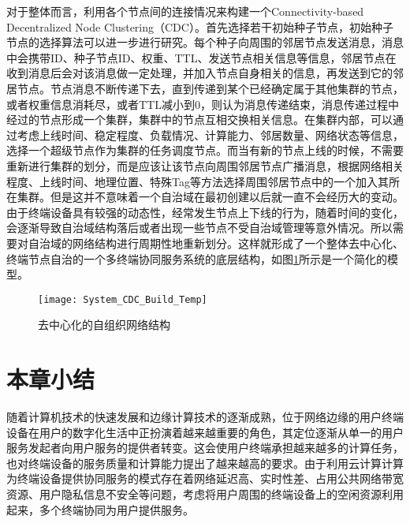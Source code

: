 对于整体而言，利用各个节点间的连接情况来构建一个Connectivity-based Decentralized Node Clustering（CDC）。首先选择若干初始种子节点，初始种子节点的选择算法可以进一步进行研究。每个种子向周围的邻居节点发送消息，消息中会携带ID、种子节点ID、权重、TTL、发送节点相关信息等信息，邻居节点在收到消息后会对该消息做一定处理，并加入节点自身相关的信息，再发送到它的邻居节点。节点消息不断传递下去，直到传递到某个已经确定属于其他集群的节点，或者权重信息消耗尽，或者TTL减小到0，则认为消息传递结束，消息传递过程中经过的节点形成一个集群，集群中的节点互相交换相关信息。在集群内部，可以通过考虑上线时间、稳定程度、负载情况、计算能力、邻居数量、网络状态等信息，选择一个超级节点作为集群的任务调度节点。而当有新的节点上线的时候，不需要重新进行集群的划分，而是应该让该节点向周围邻居节点广播消息，根据网络相关程度、上线时间、地理位置、特殊Tag等方法选择周围邻居节点中的一个加入其所在集群。但是这并不意味着一个自治域在最初创建以后就一直不会经历大的变动。由于终端设备具有较强的动态性，经常发生节点上下线的行为，随着时间的变化，会逐渐导致自治域结构落后或者出现一些节点不受自治域管理等意外情况。所以需要对自治域的网络结构进行周期性地重新划分\cite{刘福杰2004一种自组织网络管理实现方法的研究}。这样就形成了一个整体去中心化、终端节点自治的一个多终端协同服务系统的底层结构，如图\ref{fig:system_cdc_build}所示是一个简化的模型。
\begin{figure}[!htbp]
    \centering
    \texttt{[image: System\_CDC\_Build\_Temp]}
    \caption{去中心化的自组织网络结构}
    \label{fig:system_cdc_build}
\end{figure}




\section{本章小结}\label{sec:service_system_summary}

随着计算机技术的快速发展和边缘计算技术的逐渐成熟，位于网络边缘的用户终端设备在用户的数字化生活中正扮演着越来越重要的角色，其定位逐渐从单一的用户服务发起者向用户服务的提供者转变。这会使用户终端承担越来越多的计算任务，也对终端设备的服务质量和计算能力提出了越来越高的要求。由于利用云计算计算为终端设备提供协同服务的模式存在着网络延迟高、实时性差、占用公共网络带宽资源、用户隐私信息不安全等问题，考虑将用户周围的终端设备上的空闲资源利用起来，多个终端协同为用户提供服务。

